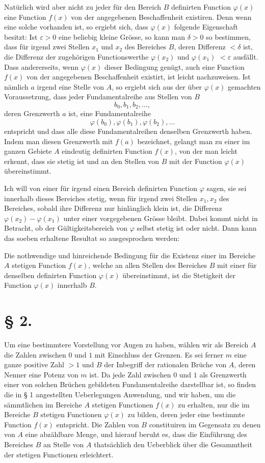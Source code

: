 Natürlich wird aber nicht zu jeder für den Bereich $B$ definirten Function $\varphi(x)$ eine Function $f(x)$ von der angegebenen Beschaffenheit existiren. Denn wenn eine solche vorhanden ist, so ergiebt sich, dass $\varphi(x)$ folgende Eigenschaft besitzt: Ist $\varepsilon>0$ eine beliebig kleine Grösse, so kann man $\delta>0$ so bestimmen, dass für irgend zwei Stellen $x_1$ und $x_2$ des Bereiches $B$, deren Differenz $<\delta$ ist, die Differenz der zugehörigen Functionswerthe $\varphi(x_2)$ und $\varphi(x_1)$ $<\varepsilon$ ausfällt. Dass andererseits, wenn $\varphi(x)$ dieser Bedingung genügt, auch eine Function $f(x)$ von der angegebenen Beschaffenheit existirt, ist leicht nachzuweisen. Ist nämlich $a$ irgend eine Stelle von $A$, so ergiebt sich aus der über $\varphi(x)$ gemachten Voraussetzung, dass jeder Fundamentalreihe aus Stellen von $B$
\[
 b_0,b_1,b_2,\ldots,
\]
deren Grenzwerth $a$ ist, eine Fundamentalreihe
\[
 \varphi(b_0),\varphi(b_1),\varphi(b_2),\ldots
\]
entspricht und dass alle diese Fundamentalreihen denselben Grenzwerth haben. Indem man diesen Grenzwerth mit $f(a)$ bezeichnet, gelangt man zu einer im ganzen Gebiete $A$ eindeutig definirten Function $f(x)$, von der man leicht erkennt, dass sie stetig ist und an den Stellen von $B$ mit der Function $\varphi(x)$ übereinstimmt.

Ich will von einer für irgend einen Bereich definirten Function $\varphi$ sagen, sie sei innerhalb dieses Bereiches stetig, wenn für irgend zwei Stellen $x_1,x_2$ des Bereiches, sobald ihre Differenz nur hinlänglich klein ist, die Differenz $\varphi(x_2)-\varphi(x_1)$ unter einer vorgegebenen Grösse bleibt. Dabei kommt nicht in Betracht, ob der Gültigkeitsbereich von $\varphi$ selbst stetig ist oder nicht. Dann kann das soeben erhaltene Resultat so ausgesprochen werden:

Die nothwendige und hinreichende Bedingung für die Existenz einer im Bereiche $A$ stetigen Function $f(x)$, welche an allen Stellen des Bereiches $B$ mit einer für denselben definirten Function $\varphi(x)$ übereinstimmt, ist die Stetigkeit der Function $\varphi(x)$ innerhalb $B$.

\section*{§ 2.}

Um eine bestimmtere Vorstellung vor Augen zu haben, wählen wir als Bereich $A$ die Zahlen zwischen $0$ und $1$ mit Einschluss der Grenzen. Es sei ferner $m$ eine ganze positive Zahl $>1$ und $B$ der Inbegriff der rationalen Brüche von $A$, deren Nenner eine Potenz von $m$ ist. Da jede Zahl zwischen $0$ und $1$ als Grenzwerth einer von solchen Brüchen gebildeten Fundamentalreihe darstellbar ist, so finden die in § 1 angestellten Ueberlegungen Anwendung, und wir haben, um die sämmtlichen im Bereiche $A$ stetigen Functionen $f(x)$ zu erhalten, nur die im Bereiche $B$ stetigen Functionen $\varphi(x)$ zu bilden, deren jeder eine bestimmte Function $f(x)$ entspricht. Die Zahlen von $B$ constituiren im Gegensatz zu denen von $A$ eine abzählbare Menge, und hierauf beruht es, dass die Einführung des Bereiches $B$ an Stelle von $A$ thatsächlich den Ueberblick über die Gesammtheit der stetigen Functionen erleichtert.

